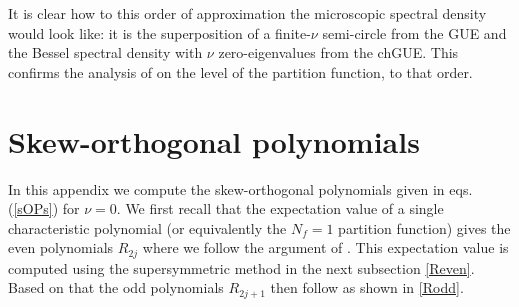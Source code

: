 \documentclass[11pt]{article}
\newcommand{\sect}[1]{\setcounter{equation}{0}\section{#1}}
\begin{document}
\begin{appendix}
It is clear how to this order of approximation the microscopic
spectral density would look like: it is the superposition of a
finite-$\nu$ semi-circle from the GUE and 
the Bessel spectral density with $\nu$ zero-eigenvalues from the
chGUE. This confirms the analysis of \cite{ADSV} on the level of the
partition function, to that order. 




\sect{Skew-orthogonal polynomials}\label{SOP-C}

In this appendix we compute the skew-orthogonal polynomials given in
eqs. (\ref{sOPs}) for $\nu=0$.
We first recall that the expectation value of a single characteristic
polynomial (or equivalently the $N_f=1$ partition function) gives the
even polynomials $R_{2j}$ where we follow the argument of
\cite{AKP}. This expectation value is
computed using the supersymmetric method in the next subsection
\ref{Reven}. Based on that the odd polynomials $R_{2j+1}$ then follow
as shown in \ref{Rodd}.


\end{appendix}
\end{document}
